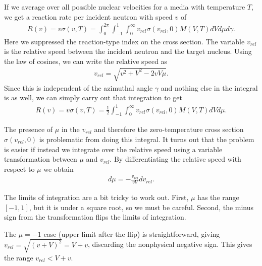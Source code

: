 If we average over all possible nuclear velocities for a media with temperature $T$, we get a reaction rate per incident neutron with speed $v$ of
\begin{align}
  R(v) = v \sigma(v,T) = \int_0^{2\pi} \int_{-1}^1 \int_0^\infty v_{rel} \sigma(v_{rel},0) M(V,T) dV d\mu d\gamma . 
\end{align}
Here we suppressed the reaction-type index on the cross section. The variable $v_{rel}$ is the relative speed between the incident neutron and the target nucleus. Using the law of cosines, we can write the relative speed as
\begin{align}
  v_{rel} = \sqrt{ v^2 + V^2 - 2 v V \mu } .
\end{align}
Since this is independent of the azimuthal angle $\gamma$ and nothing else in the integral is as well, we can simply carry out that integration to get
\begin{align}
  R(v) = v \sigma(v,T) = \frac{1}{2} \int_{-1}^1 \int_0^\infty v_{rel} \sigma(v_{rel},0) M(V,T) dV d\mu  . \label{Eq:libraryGeneration_thermalAverageReactionRate_azimuthallyIntegrated}
\end{align}

The presence of $\mu$ in the $v_{rel}$ and therefore the zero-temperature cross section $\sigma(v_{rel},0)$ is problematic from doing this integral. It turns out that the problem is easier if instead we integrate over the relative speed using a variable transformation between $\mu$ and $v_{rel}$. By differentiating the relative speed with respect to $\mu$ we obtain
\begin{align}
  d\mu = -\frac{v_{rel}}{v V} dv_{rel} .
\end{align}

The limits of integration are a bit tricky to work out. First, $\mu$ has the range $[-1,1]$, but it is under a square root, so we must be careful. Second, the minus sign from the transformation flips the limits of integration. 

The $\mu = -1$ case (upper limit after the flip) is straightforward, giving $v_{rel} = \sqrt{(v+V)^2} = V + v$, discarding the nonphysical negative sign. This gives the range $v_{rel} < V + v$.

